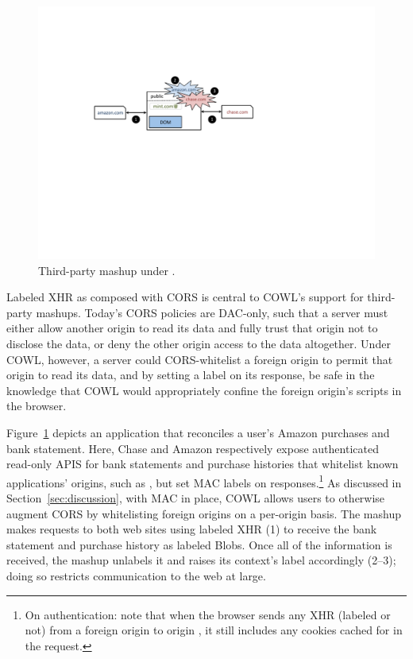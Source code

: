 \begin{figure}
\centerline{\includegraphics[width=\columnwidth]{mashup}}
\caption{\label{fig:mashup} Third-party mashup under \sys{}.}
\end{figure}
Labeled XHR as composed with CORS is central to COWL's support for
third-party mashups.
%
Today's CORS policies are DAC-only, such that a server must either
allow another origin to read its data and fully trust that origin not
to disclose the data, or deny the other origin access to the data
altogether. Under COWL, however, a server could CORS-whitelist a
foreign origin to permit that origin to read its data, and by setting
a label on its response, be safe in the knowledge that COWL would
appropriately confine the foreign origin's scripts in the browser.
 
Figure~\ref{fig:mashup} depicts an application that reconciles a
user's Amazon purchases and bank statement.
%
Here, Chase and Amazon respectively expose authenticated read-only
APIS for bank statements and purchase histories that whitelist known
applications' origins, such as , but set MAC labels on
responses.\footnote{On authentication: note that when the browser
  sends any XHR (labeled or not) from a foreign origin to origin
  , it still includes any cookies cached for
   in the request.}
%
As discussed in Section~\ref{sec:discussion}, with MAC in place, COWL
allows users to otherwise augment CORS by whitelisting foreign origins
on a per-origin basis.
%
%
The mashup makes requests to both web sites using labeled XHR (1)
to receive the bank statement and
purchase history as labeled Blobs.
%
Once all of the information is received, the mashup unlabels it and
raises its context's label accordingly (2--3); doing so restricts
communication to the web at large.


